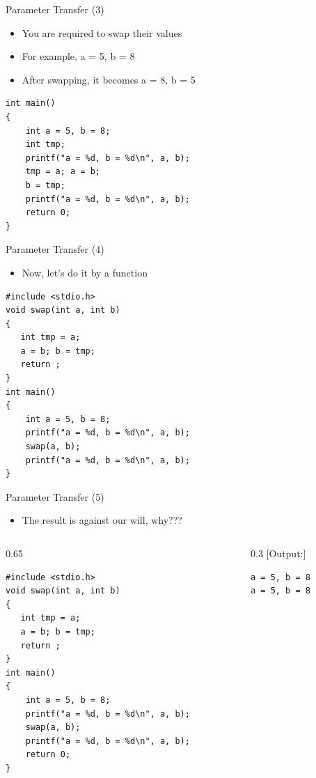 \begin{frame}[fragile]{Parameter Transfer (3)}
\begin{itemize}
	\item {You are required to swap their values}
	\item {For example, a = 5, b = 8}
	\item {After swapping, it becomes a = 8, b = 5}
\end{itemize}
\begin{lstlisting}
int main()
{
    int a = 5, b = 8;
    int tmp;
    printf("a = %d, b = %d\n", a, b);
    tmp = a; a = b;
    b = tmp;
    printf("a = %d, b = %d\n", a, b);
    return 0;
}
\end{lstlisting}

\end{frame}

\begin{frame}[fragile]{Parameter Transfer (4)}
\begin{itemize}
	\item {Now, let's do it by a function}
\end{itemize}
\begin{lstlisting}
#include <stdio.h>
void swap(int a, int b)
{
   int tmp = a;
   a = b; b = tmp;
   return ;
}
int main()
{
    int a = 5, b = 8;
    printf("a = %d, b = %d\n", a, b);
    swap(a, b);
    printf("a = %d, b = %d\n", a, b);
}
\end{lstlisting}
\end{frame}

\begin{frame}[fragile]{Parameter Transfer (5)}
\begin{itemize}
	\item {The result is against our will, why???}
\end{itemize}
\begin{columns}
\begin{column}{0.65\linewidth}
\begin{lstlisting}
#include <stdio.h>
void swap(int a, int b)
{
   int tmp = a;
   a = b; b = tmp;
   return ;
}
int main()
{
    int a = 5, b = 8;
    printf("a = %d, b = %d\n", a, b);
    swap(a, b);
    printf("a = %d, b = %d\n", a, b);
    return 0;
}
\end{lstlisting}
\end{column}
\begin{column}{0.3\linewidth}
[Output:]
\begin{lstlisting}
a = 5, b = 8
a = 5, b = 8
\end{lstlisting}
\end{column}
\end{columns}
\end{frame}

